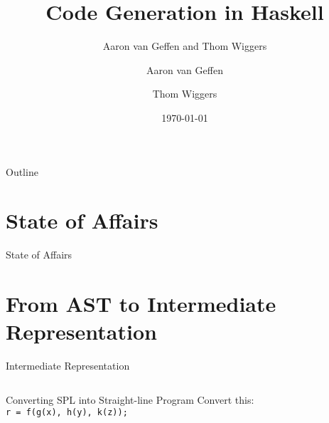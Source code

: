 \documentclass[department=icis, slidenumbers=slide, official=true]{beamerruhuisstijl}
\title{Code Generation in Haskell}
\subtitle{Aaron van Geffen and Thom Wiggers}
\date{\today}
\author{Aaron van Geffen \and Thom Wiggers}
\begin{document}
\begin{frame}
    \titlepage{}
\end{frame}












\begin{frame}{Outline}
    \tableofcontents
\end{frame}


\section{State of Affairs}
\begin{frame}{State of Affairs} %

\end{frame}


\section{From AST to Intermediate Representation}
\begin{frame}{Intermediate Representation}
    \fontsize{8pt}{12}\selectfont
    \inputminted{Haskell}{examples/ir_instructions.hs}
\end{frame}

\begin{frame}{Converting SPL into Straight-line Program}
    \vspace{30pt}
    Convert this: \\
    \texttt{r = f(g(x), h(y), k(z));}

    \vspace{30pt}
\end{frame}
\end{document}
